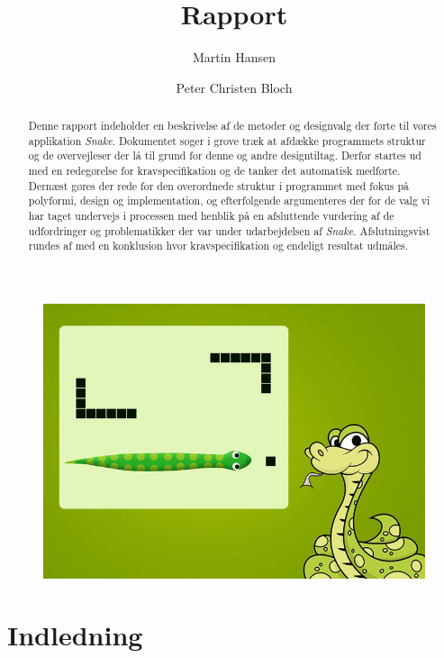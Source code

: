 \documentclass[]{article}
\title{Rapport}
\author{Martin Hansen \and Peter Christen Bloch}
\begin{document}
\maketitle

\begin{figure}[h!]
	\centering
	\includegraphics[width=\linewidth]{Snake_pic.jpg}
	\label{fig:diagram}
\end{figure}

\pagebreak %

\begin{abstract}

Denne rapport indeholder en beskrivelse af de metoder og designvalg der førte til vores applikation \textit{Snake}. Dokumentet søger i grove træk at afdække programmets struktur og de overvejleser der lå til grund for denne og andre designtiltag. Derfor startes ud med en redegørelse for kravspecifikation og de tanker det automatisk medførte. Dernæst gøres der rede for den overordnede struktur i programmet med fokus på polyformi, design og implementation, og efterfølgende argumenteres der for de valg vi har taget undervejs i processen med henblik på en afsluttende vurdering af de udfordringer og problematikker der var under udarbejdelsen af \textit{Snake}. Afslutningsvist rundes af med en konklusion hvor kravspecifikation og endeligt resultat udmåles.	
	
\end{abstract}

\pagebreak %
\tableofcontents

\pagebreak
\section{Indledning}
\end{document}

